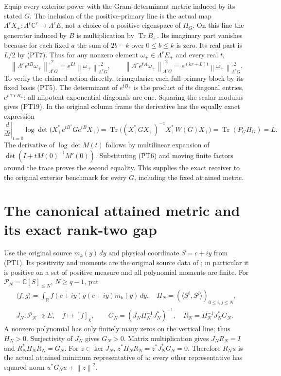 \documentclass[11pt]{article}
\newcommand{\C}{\mathbb C}
\newcommand{\R}{\mathbb R}
\newcommand{\PP}{\mathcal P}
\newcommand{\norm}[1]{\left\lVert#1\right\rVert}
\DeclareMathOperator{\Tr}{Tr}
\begin{document}
Equip every exterior power with the Gram-determinant metric induced
by its stated \(G\). The inclusion of the positive-primary line is
the actual map
\(\Lambda^rX_+:\Lambda^r\C^r\to\Lambda^r E\), not a
choice of a positive eigenspace of \(H_G\). On this line the
generator induced by \(B\) is multiplication by \(\Tr B_+\).
Its imaginary part vanishes because for each fixed \(a\) the
sum of \(2b-k\) over \(0\le b\le k\) is zero. Its real
part is \(L/2\) by (PT7). Thus for any nonzero element
\(\omega_+\in\Lambda^r E_+\) and every real \(t\),
\begin{equation}\tag{PT19}
 \norm{\Lambda^r e^{tB}\omega_+}_{\Lambda^rG}^{,2}
       =e^{Lt}\norm{\omega_+}_{\Lambda^rG}^{,2},\qquad
 \norm{\Lambda^r e^{tA}\omega_+}_{\Lambda^rG}^{,2}
       =e^{(kr+L)t}\norm{\omega_+}_{\Lambda^rG}^{,2}.
\end{equation}
To verify the claimed action directly, triangularize each full
primary block by its fixed basis (PT5). The determinant of
\(e^{tB_+}\) is the product of its diagonal entries,
\(e^{t\Tr B_+}\); all nilpotent exponential diagonals are one.
Squaring the scalar modulus gives (PT19). In the original column
frame the derivative has the equally exact expression
\begin{equation}\tag{PT20}
 \left.\frac{d}{dt}\right|_{t=0}
 \log\det\bigl(X_+^*e^{tB^*}Ge^{tB}X_+\bigr)
 =\Tr\bigl((X_+^*GX_+)^{-1}X_+^*W(G)X_+\bigr)
 =\Tr(P_GH_G)=L.
\end{equation}
The derivative of \(\log\det M(t)\) follows by multilinear
expansion of \(\det(I+tM(0)^{-1}M'(0))\). Substituting (PT6)
and moving finite factors around the trace proves the second
equality. This supplies the exact receiver to the original exterior
benchmark for every \(G\), including the fixed attained metric.

\section{The canonical attained metric and its exact rank-two gap}

Use the original source \(m_k(y)\,dy\) and physical coordinate
\(S=c+iy\) from (PT1). Its positivity and moments are the original
source data of \cite{gmf}; in particular it is positive on a set
of positive measure and all polynomial moments are finite. For
\(\PP_N=\C[S]_{\le N}\), \(N\ge q-1\), put
\begin{equation}\tag{PT21}
 \begin{gathered}
 \langle f,g\rangle=\int_\R\overline{f(c+iy)}g(c+iy)m_k(y)\,dy,
 \quad H_N=(\langle S^i,S^j\rangle)_{0\le i,j\le N},\\
 J_N:\PP_N\twoheadrightarrow E,\quad f\mapsto[f]_\chi,\qquad
 G_N=(J_NH_N^{-1}J_N^*)^{-1},\quad
 R_N=H_N^{-1}J_N^*G_N.
 \end{gathered}
\end{equation}
A nonzero polynomial has only finitely many zeros on the vertical
line; thus \(H_N>0\). Surjectivity of \(J_N\) gives \(G_N>0\).
Matrix multiplication gives \(J_NR_N=I\) and
\(R_N^*H_NR_N=G_N\). For \(z\in\ker J_N\),
\(z^*H_NR_N=z^*J_N^*G_N=0\). Therefore \(R_Nu\) is the
actual attained minimum representative of \(u\); every other
representative has squared norm \(u^*G_Nu+\norm z^2\).
\end{document}
